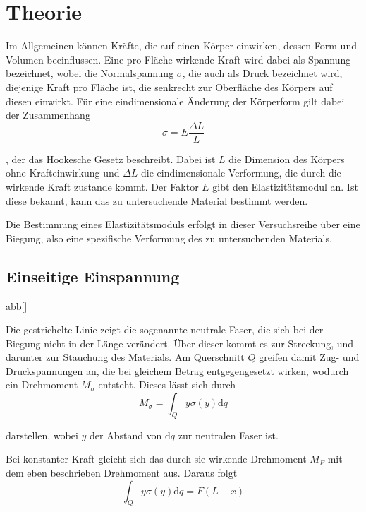 \section{Theorie}
\label{sec:Theorie}

Im Allgemeinen können Kräfte, die auf einen Körper einwirken, dessen Form und Volumen beeinflussen. 
Eine pro Fläche wirkende Kraft wird dabei als Spannung bezeichnet, wobei die Normalspannung $\sigma$, die auch als Druck bezeichnet wird,
diejenige Kraft pro Fläche ist, die senkrecht zur Oberfläche des Körpers auf diesen einwirkt. Für eine eindimensionale Änderung der
Körperform gilt dabei der Zusammenhang \begin{equation}
    \sigma = E \frac{\Delta L}L
\end{equation}

, der das Hookesche Gesetz beschreibt. Dabei ist $L$ die Dimension des Körpers ohne Krafteinwirkung und $\Delta L$ die eindimensionale
Verformung, die durch die wirkende Kraft zustande kommt. Der Faktor $E$ gibt den Elastizitätsmodul an. Ist diese bekannt, kann das zu 
untersuchende Material bestimmt werden. 

Die Bestimmung eines Elastizitätsmoduls erfolgt in dieser Versuchsreihe über eine Biegung, also eine spezifische Verformung des zu 
untersuchenden Materials. 

\subsection{Einseitige Einspannung}

abb[]

Die gestrichelte Linie zeigt die sogenannte neutrale Faser, die sich bei der Biegung nicht in der Länge verändert. 
Über dieser kommt es zur Streckung, und darunter zur Stauchung des Materials. Am Querschnitt $Q$ greifen damit Zug- und Druckspannungen
an, die bei gleichem Betrag entgegengesetzt wirken, wodurch ein Drehmoment $M_{\sigma}$ entsteht. Dieses lässt sich durch \begin{equation}
    M_{\sigma} = \int_Q y\sigma(y)\text{d}q
\end{equation}

darstellen, wobei $y$ der Abstand von $\text{d}q$ zur neutralen Faser ist.

Bei konstanter Kraft gleicht sich das durch sie wirkende Drehmoment $M_F$ mit dem eben beschrieben Drehmoment aus. Daraus folgt \begin{equation}
    \int_Q y\sigma(y)\text{d}q = F (L - x) 
\end{equation}

